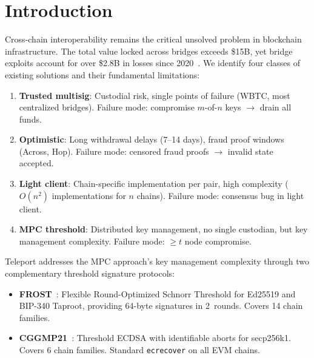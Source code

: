 \section{Introduction}

\label{sec:intro}

Cross-chain interoperability remains the critical unsolved problem in blockchain infrastructure. The total value locked across bridges exceeds \$15B, yet bridge exploits account for over \$2.8B in losses since 2020~\cite{rekt}. We identify four classes of existing solutions and their fundamental limitations:

\begin{enumerate}[nosep]
  \item \textbf{Trusted multisig}: Custodial risk, single points of failure (WBTC, most centralized bridges). Failure mode: compromise $m$-of-$n$ keys $\to$ drain all funds.
  \item \textbf{Optimistic}: Long withdrawal delays (7--14 days), fraud proof windows (Across, Hop). Failure mode: censored fraud proofs $\to$ invalid state accepted.
  \item \textbf{Light client}: Chain-specific implementation per pair, high complexity ($O(n^2)$ implementations for $n$ chains). Failure mode: consensus bug in light client.
  \item \textbf{MPC threshold}: Distributed key management, no single custodian, but key management complexity. Failure mode: $\geq t$ node compromise.
\end{enumerate}

Teleport addresses the MPC approach's key management complexity through two complementary threshold signature protocols:

\begin{itemize}[nosep]
  \item \textbf{FROST}~\cite{frost}: Flexible Round-Optimized Schnorr Threshold for Ed25519 and BIP-340 Taproot, providing 64-byte signatures in 2~rounds. Covers 14 chain families.
  \item \textbf{CGGMP21}~\cite{cggmp21}: Threshold ECDSA with identifiable aborts for secp256k1. Covers 6 chain families. Standard \texttt{ecrecover} on all EVM chains.
\end{itemize}


